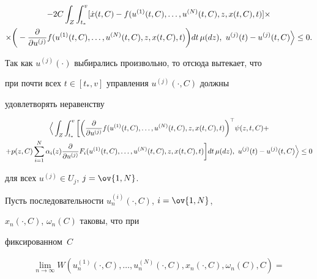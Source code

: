\begin{pf}
\begin{gather*}
%


-2C\int_Z\int^v_{t_*}[\Dot x(t,C)-f 


(u^{(1)}(t,C),\dotsc,u^{(N)}(t,C),z,x(t,C),t)]\times \\ 


\times\bigg(-\frac{\partial}{\partial u^{(j)}}f 


(u^{(1)}(t,C),\dotsc,u^{(N)}(t,C),z,x(t,C),t)\bigg) 


dt\,\mu(dz),\ u^{(j)}(t)-u^{(j)}(t,C)\Big\ra\le0. 


\end{gather*} 


 


Так как $u^{(j)}(\cdot)$ выбирались произвольно, то отсюда вытекает, что 


при почти всех $t\in[t_*,v]$ управления $u^{(j)}(\cdot,C)$ должны 


удовлетворять неравенству 


\begin{gather} 


\Big\la\int_Z\int^v_{t_*}\bigg[\bigg( 


\frac{\partial}{\partial u^{(j)}}f 


(u^{(1)}(t,C),\dotsc,u^{(N)}(t,C),z,x(t,C),t)\bigg)^\top 


\psi(z,t,C)+\notag \\ 


+p(z,C)\sum^N_{i=1}\alpha_i(z)\frac{\partial}{\partial u^{(j)}} 


F_i(u^{(1)}(t,C),\dotsc,u^{(N)}(t,C),z,x(t,C),t)\bigg] 


dt\,\mu(dz),\ u^{(j)}(t)-u^{(j)}(t,C)\Big\ra\le0 


\end{gather} 


для всех $u^{(j)}\in U_j$, $j=\ov{1,N}$. 


 


Пусть последовательности $u^{(i)}_n(\cdot,C)$, $i=\ov{1,N}$, 


$x_n(\cdot,C)$, $\omega_n(C)$ таковы, что при 


фиксированном~$C$ 


\begin{multline*} 


\lim_{n\to\infty}W(u^{(1)}_n(\cdot,C),\dotsc,u^{(N)}_n 


(\cdot,C),x_n(\cdot,C),\omega_n(C),C)=\\ 



\end{multline*}
\end{pf}
